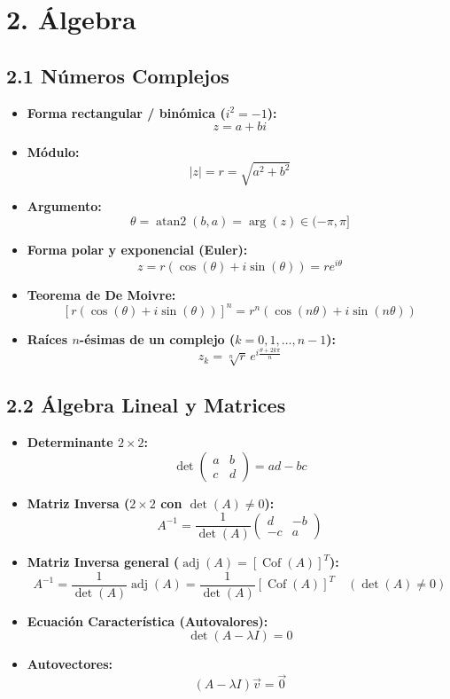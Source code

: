 \documentclass[11pt,a4paper]{article}
\begin{document}
\section*{2. Álgebra}

\subsection*{2.1 Números Complejos}

\begin{itemize}
  \item \textbf{Forma rectangular / binómica ($i^2 = -1$):}
  \[
    z = a + bi
  \]
  \item \textbf{Módulo:}
  \[
    |z| = r = \sqrt{a^2 + b^2}
  \]
  \item \textbf{Argumento:}
  \[
    \theta = \operatorname{atan2}(b, a) = \operatorname{arg}(z) \in (-\pi, \pi]
  \]
  \item \textbf{Forma polar y exponencial (Euler):}
  \[
    z = r(\cos(\theta) + i\sin(\theta)) = r e^{i\theta}
  \]
  \item \textbf{Teorema de De Moivre:}
  \[
    [r(\cos(\theta) + i\sin(\theta))]^n = r^n (\cos(n\theta) + i\sin(n\theta))
  \]
  \item \textbf{Raíces $n$-ésimas de un complejo ($k = 0, 1, \dots, n-1$):}
  \[
    z_k = \sqrt[n]{r} \, e^{i \frac{\theta + 2k\pi}{n}}
  \]
\end{itemize}

\subsection*{2.2 Álgebra Lineal y Matrices}

\begin{itemize}
  \item \textbf{Determinante $2 \times 2$:}
  \[
    \det \begin{pmatrix} a & b \\ c & d \end{pmatrix} = ad - bc
  \]
  \item \textbf{Matriz Inversa ($2 \times 2$ con $\det(A) \ne 0$):}
  \[
    A^{-1} = \frac{1}{\det(A)} \begin{pmatrix} d & -b \\ -c & a \end{pmatrix}
  \]
  \item \textbf{Matriz Inversa general ($\operatorname{adj}(A) = [\operatorname{Cof}(A)]^T$):}
  \[
    A^{-1} = \frac{1}{\det(A)} \operatorname{adj}(A) = \frac{1}{\det(A)} [\operatorname{Cof}(A)]^T \quad (\det(A) \ne 0)
  \]
  \item \textbf{Ecuación Característica (Autovalores):}
  \[
    \det(A - \lambda I) = 0
  \]
  \item \textbf{Autovectores:}
  \[
    (A - \lambda I)\vec{v} = \vec{0}
  \]
\end{itemize}
\end{document}

